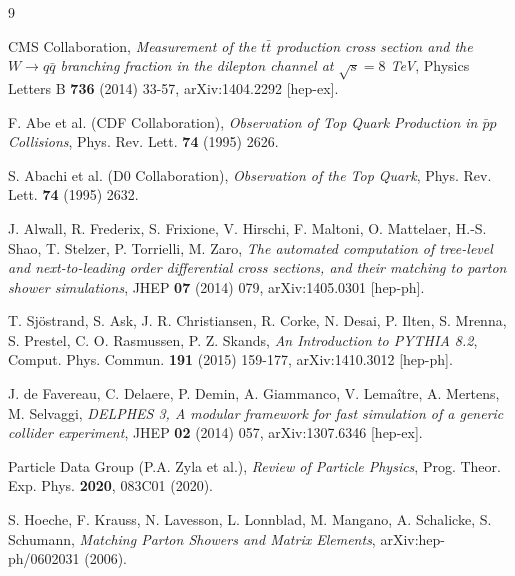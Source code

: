 \documentclass[11pt,a4paper]{article}
\begin{document}
\newpage
\begin{thebibliography}{9}

CMS Collaboration, 
\textit{Measurement of the $t\bar{t}$ production cross section and the $W \to q\bar{q}$ branching fraction in the dilepton channel at $\sqrt{s} = 8$ TeV}, 
Physics Letters B \textbf{736} (2014) 33-57, 
arXiv:1404.2292 [hep-ex].

F. Abe et al. (CDF Collaboration), 
\textit{Observation of Top Quark Production in $\bar{p}p$ Collisions}, 
Phys. Rev. Lett. \textbf{74} (1995) 2626.

S. Abachi et al. (D0 Collaboration), 
\textit{Observation of the Top Quark}, 
Phys. Rev. Lett. \textbf{74} (1995) 2632.

J. Alwall, R. Frederix, S. Frixione, V. Hirschi, F. Maltoni, O. Mattelaer, H.-S. Shao, T. Stelzer, P. Torrielli, M. Zaro, 
\textit{The automated computation of tree-level and next-to-leading order differential cross sections, and their matching to parton shower simulations}, 
JHEP \textbf{07} (2014) 079, 
arXiv:1405.0301 [hep-ph].

T. Sjöstrand, S. Ask, J. R. Christiansen, R. Corke, N. Desai, P. Ilten, S. Mrenna, S. Prestel, C. O. Rasmussen, P. Z. Skands, 
\textit{An Introduction to PYTHIA 8.2}, 
Comput. Phys. Commun. \textbf{191} (2015) 159-177, 
arXiv:1410.3012 [hep-ph].

J. de Favereau, C. Delaere, P. Demin, A. Giammanco, V. Lemaître, A. Mertens, M. Selvaggi, 
\textit{DELPHES 3, A modular framework for fast simulation of a generic collider experiment}, 
JHEP \textbf{02} (2014) 057, 
arXiv:1307.6346 [hep-ex].

Particle Data Group (P.A. Zyla et al.), 
\textit{Review of Particle Physics}, 
Prog. Theor. Exp. Phys. \textbf{2020}, 083C01 (2020).

S. Hoeche, F. Krauss, N. Lavesson, L. Lonnblad, M. Mangano, A. Schalicke, S. Schumann, 
\textit{Matching Parton Showers and Matrix Elements}, 
arXiv:hep-ph/0602031 (2006).

\end{thebibliography}
\end{document}
